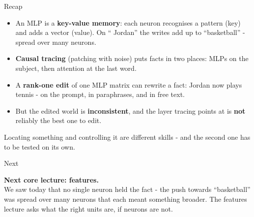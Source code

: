 \documentclass[aspectratio=169]{beamer}
\newcommand{\takebox}[1]{%
  \begin{tcolorbox}[colback=paramgreen!8, colframe=paramgreen, boxrule=0.6pt, arc=2pt]
  #1
  \end{tcolorbox}}
\begin{document}
\begin{frame}{Recap}
  \vspace{0.3em}
  \begin{itemize}
    \item An MLP is a \textbf{key-value memory}: each neuron recognises a pattern (key) and adds a
      vector (value). On `` Jordan'' the writes add up to ``basketball'' - spread over many neurons.
    \item \textbf{Causal tracing} (patching with noise) puts facts in two places: MLPs on the
      subject, then attention at the last word.
    \item A \textbf{rank-one edit} of one MLP matrix can rewrite a fact: Jordan now plays tennis - on the prompt, in paraphrases, and in free text.
    \item But the edited world is \textbf{inconsistent}, and the layer tracing points at is
      \textbf{not} reliably the best one to edit.
  \end{itemize}

  \vspace{0.4em}
  \takebox{\small Locating something and controlling it are different skills - and the second one
  has to be tested on its own.}
\end{frame}

\begin{frame}{Next}
  \vspace{1.2em}
  \takebox{\textbf{Next core lecture: features.}\\[0.6em]
  We saw today that no single neuron held the fact - the push towards ``basketball'' was spread
  over many neurons that each meant something broader. The features lecture asks what the right
  units are, if neurons are not.}
\end{frame}
\end{document}
